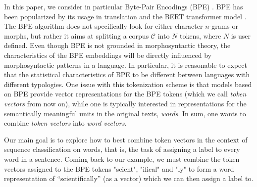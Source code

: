 \documentclass[11pt]{article}
\newcommand\citep{\cite}
\begin{document}
        In this paper, we consider in particular Byte-Pair Encodings
     (BPE) \citep{sennrich2015neural}.  BPE has been popularized by
     its usage in translation and the BERT transformer model
     \citep{devlin2018bert}.  The BPE algorithm does not specifically
     look for either character $n$-grams or morphs, but rather it aims
     at splitting a corpus $\mathcal{C}$ into $N$ tokens, where $N$ is
     user defined.
    Even though BPE is not grounded in morphosyntactic theory, the
     characteristics of the BPE embeddings will be directly influenced
     by morphosyntactic patterns in a language. In particular, it is
     reasonable to expect that the statistical characteristics of BPE
     to be different between languages with different typologies.
     One issue with this tokenization scheme is that models based on
     BPE provide vector representations for the BPE tokens (which we
     call \emph{token vectors} from now on), while one is typically
     interested in representations for the semantically meaningful
     units in the original texts, \emph{words}. In sum,
     one wants to combine \emph{token vectors} into
     \emph{word vectors}.

     Our main goal is to explore how to best combine token vectors  in
     the context of sequence classification on words, that is, the
     task of assigning a label to every word in a sentence.
          Coming back to our example, we must combine the token
     vectors assigned to the BPE tokens "scient", "ifical" and "ly" to
     form a word representation of ``scientifically'' (as a vector)
     which we can then assign a label to.

\end{document}
